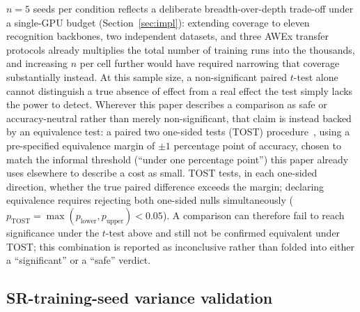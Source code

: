 \documentclass[pdflatex,sn-vancouver-num]{sn-jnl}
\begin{document}
$n=5$ seeds per condition reflects a deliberate breadth-over-depth trade-off under a single-GPU budget (Section~\ref{sec:impl}): extending coverage to eleven recognition backbones, two independent datasets, and three AWEx transfer protocols already multiplies the total number of training runs into the thousands, and increasing $n$ per cell further would have required narrowing that coverage substantially instead. At this sample size, a non-significant paired $t$-test alone cannot distinguish a true absence of effect from a real effect the test simply lacks the power to detect. Wherever this paper describes a comparison as safe or accuracy-neutral rather than merely non-significant, that claim is instead backed by an equivalence test: a paired two one-sided tests (TOST) procedure~\cite{schuirmann1987tost,lakens2017equivalence}, using a pre-specified equivalence margin of $\pm 1$ percentage point of accuracy, chosen to match the informal threshold (``under one percentage point'') this paper already uses elsewhere to describe a cost as small. TOST tests, in each one-sided direction, whether the true paired difference exceeds the margin; declaring equivalence requires rejecting both one-sided nulls simultaneously ($p_{\text{TOST}} = \max(p_{\text{lower}}, p_{\text{upper}}) < 0.05$). A comparison can therefore fail to reach significance under the $t$-test above and still not be confirmed equivalent under TOST; this combination is reported as inconclusive rather than folded into either a ``significant'' or a ``safe'' verdict.

\subsection{SR-training-seed variance validation}
\label{sec:sr-seed-variance}
\end{document}
